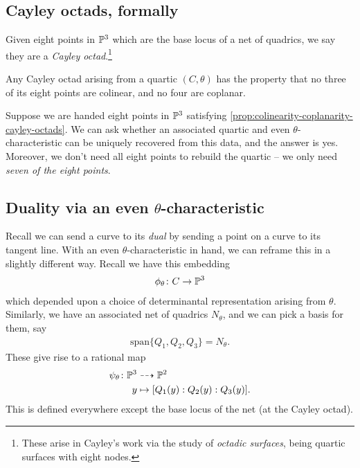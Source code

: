 \documentclass[11pt]{amsart}
\begin{document}
\subsection{Cayley octads, formally}

\begin{definition}
Given eight points in $\P^3$ which are the base locus of a net of quadrics, we say they are a \textit{Cayley octad}.\footnote{These arise in Cayley's work via the study of \textit{octadic surfaces}, being quartic surfaces with eight nodes.}
\end{definition}


\begin{proposition}
\label{prop:colinearity-coplanarity-cayley-octads}
Any Cayley octad arising from a quartic $(C,\theta)$ has the property that no three of its eight points are colinear, and no four are coplanar.
\end{proposition}

Suppose we are handed eight points in $\P^3$ satisfying \autoref{prop:colinearity-coplanarity-cayley-octads}. We can ask whether an associated quartic and even $\theta$-characteristic can be uniquely recovered from this data, and the answer is yes. Moreover, we don't need all eight points to rebuild the quartic -- we only need \textit{seven of the eight points}.

\subsection{Duality via an even \texorpdfstring{$\theta$}{theta}-characteristic}

Recall we can send a curve to its \textit{dual} by sending a point on a curve to its tangent line. With an even $\theta$-characteristic in hand, we can reframe this in a slightly different way. Recall we have this embedding
\begin{align*}
    \phi_\theta \colon C \to \P^3
\end{align*}
which depended upon a choice of determinantal representation arising from $\theta$. Similarly, we have an associated net of quadrics $N_\theta$, and we can pick a basis for them, say
\begin{align*}
    \text{span}\{Q_1,Q_2,Q_3\} = N_\theta.
\end{align*}
These give rise to a rational map
\begin{align*}
    \psi_\theta \colon \P^3 &\dashto \P^2 \\
    y &\mapsto [Q_1(y) : Q_2(y) : Q_3(y)].
\end{align*}
%
This is defined everywhere except the base locus of the net (at the Cayley octad).
\end{document}
